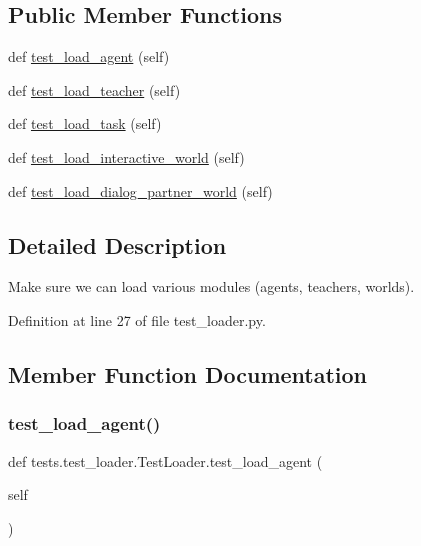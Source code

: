 \subsection*{Public Member Functions}
\begin{DoxyCompactItemize}
\item 
def \hyperlink{classtests_1_1test__loader_1_1TestLoader_acb4af1d2d98d9d64b822531cba7cdcc5}{test\+\_\+load\+\_\+agent} (self)
\item 
def \hyperlink{classtests_1_1test__loader_1_1TestLoader_ae07019386f70e81a2963e2adba114d3a}{test\+\_\+load\+\_\+teacher} (self)
\item 
def \hyperlink{classtests_1_1test__loader_1_1TestLoader_af69bc77228b2955fc5b55099d7f1ce32}{test\+\_\+load\+\_\+task} (self)
\item 
def \hyperlink{classtests_1_1test__loader_1_1TestLoader_a723d2148afd57eaa33324a658600872f}{test\+\_\+load\+\_\+interactive\+\_\+world} (self)
\item 
def \hyperlink{classtests_1_1test__loader_1_1TestLoader_a5fa14132e0803df0dd9237b3398f876a}{test\+\_\+load\+\_\+dialog\+\_\+partner\+\_\+world} (self)
\end{DoxyCompactItemize}


\subsection{Detailed Description}
\begin{DoxyVerb}Make sure we can load various modules (agents, teachers, worlds).
\end{DoxyVerb}
 

Definition at line 27 of file test\+\_\+loader.\+py.



\subsection{Member Function Documentation}
\mbox{\label{classtests_1_1test__loader_1_1TestLoader_acb4af1d2d98d9d64b822531cba7cdcc5}} 
\subsubsection{\texorpdfstring{test\+\_\+load\+\_\+agent()}{test\_load\_agent()}}
{\footnotesize\ttfamily def tests.\+test\+\_\+loader.\+Test\+Loader.\+test\+\_\+load\+\_\+agent (\begin{DoxyParamCaption}\item[{}]{self }\end{DoxyParamCaption})}



